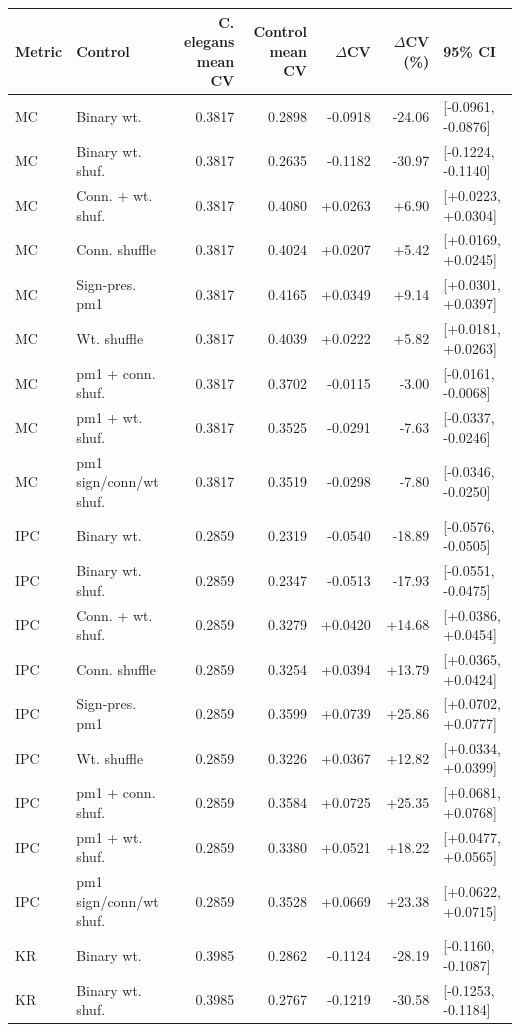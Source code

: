 \begin{tabular}{llrrrrl}
\toprule
Metric & Control & C. elegans mean CV & Control mean CV & $\Delta$CV & $\Delta$CV (\%) & 95\% CI \\
\midrule
MC & Binary wt. & 0.3817 & 0.2898 & -0.0918 & -24.06 & [-0.0961, -0.0876] \\
MC & Binary wt. shuf. & 0.3817 & 0.2635 & -0.1182 & -30.97 & [-0.1224, -0.1140] \\
MC & Conn. + wt. shuf. & 0.3817 & 0.4080 & +0.0263 & +6.90 & [+0.0223, +0.0304] \\
MC & Conn. shuffle & 0.3817 & 0.4024 & +0.0207 & +5.42 & [+0.0169, +0.0245] \\
MC & Sign-pres. pm1 & 0.3817 & 0.4165 & +0.0349 & +9.14 & [+0.0301, +0.0397] \\
MC & Wt. shuffle & 0.3817 & 0.4039 & +0.0222 & +5.82 & [+0.0181, +0.0263] \\
MC & pm1 + conn. shuf. & 0.3817 & 0.3702 & -0.0115 & -3.00 & [-0.0161, -0.0068] \\
MC & pm1 + wt. shuf. & 0.3817 & 0.3525 & -0.0291 & -7.63 & [-0.0337, -0.0246] \\
MC & pm1 sign/conn/wt shuf. & 0.3817 & 0.3519 & -0.0298 & -7.80 & [-0.0346, -0.0250] \\
IPC & Binary wt. & 0.2859 & 0.2319 & -0.0540 & -18.89 & [-0.0576, -0.0505] \\
IPC & Binary wt. shuf. & 0.2859 & 0.2347 & -0.0513 & -17.93 & [-0.0551, -0.0475] \\
IPC & Conn. + wt. shuf. & 0.2859 & 0.3279 & +0.0420 & +14.68 & [+0.0386, +0.0454] \\
IPC & Conn. shuffle & 0.2859 & 0.3254 & +0.0394 & +13.79 & [+0.0365, +0.0424] \\
IPC & Sign-pres. pm1 & 0.2859 & 0.3599 & +0.0739 & +25.86 & [+0.0702, +0.0777] \\
IPC & Wt. shuffle & 0.2859 & 0.3226 & +0.0367 & +12.82 & [+0.0334, +0.0399] \\
IPC & pm1 + conn. shuf. & 0.2859 & 0.3584 & +0.0725 & +25.35 & [+0.0681, +0.0768] \\
IPC & pm1 + wt. shuf. & 0.2859 & 0.3380 & +0.0521 & +18.22 & [+0.0477, +0.0565] \\
IPC & pm1 sign/conn/wt shuf. & 0.2859 & 0.3528 & +0.0669 & +23.38 & [+0.0622, +0.0715] \\
KR & Binary wt. & 0.3985 & 0.2862 & -0.1124 & -28.19 & [-0.1160, -0.1087] \\
KR & Binary wt. shuf. & 0.3985 & 0.2767 & -0.1219 & -30.58 & [-0.1253, -0.1184] \\

\end{tabular}
